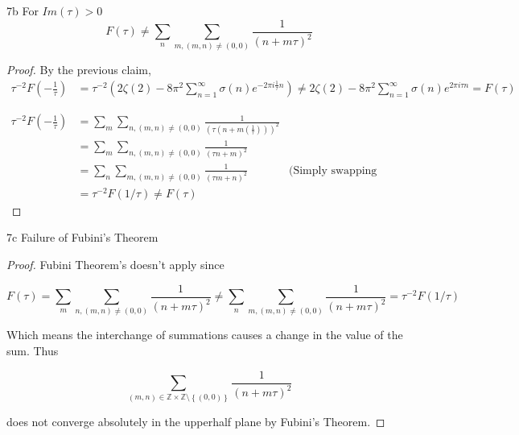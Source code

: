 \documentclass{article}
\newcommand{\Z}{\mathbb{Z}}
\begin{document}
\begin{PROB}{7b}\label{Problem 7b.}
    For $Im(\tau) > 0$ 
    \begin{equation*}
        F(\tau) \neq \sum_{n} \sum_{m, (m, n) \neq (0, 0)} \frac{1}{(n + m \tau)^2}
    \end{equation*}
\end{PROB}
\begin{proof}
    By the previous claim, 
    \begin{align*}
        \tau^{-2} F\left(-\frac{1}{\tau}\right) &= \tau^{-2}\left(2\zeta(2) - 8 \pi^2\sum_{n = 1}^{\infty} \sigma(n) e^{-2 \pi i \frac{1}{\tau} n}\right) \neq 2\zeta(2) - 8 \pi^2\sum_{n = 1}^{\infty} \sigma(n) e^{2 \pi i \tau n} = F(\tau)
    \end{align*}

    \begin{align*}
        \tau^{-2} F\left(-\frac{1}{\tau}\right) &= \sum_{m} \sum_{n, (m, n) \neq (0, 0)} \frac{1}{(\tau(n + m (\frac{1}{\tau})))^2} \\
        &=\sum_{m} \sum_{n, (m, n) \neq (0, 0)} \frac{1}{(\tau n + m)^2} \\
        &=\sum_{n} \sum_{m, (m, n) \neq (0, 0)} \frac{1}{(\tau m + n)^2} & \text{(Simply swapping symbol names)} \\
        &= \tau^{-2} F(1 / \tau) \neq F(\tau)
    \end{align*}
\end{proof}

\begin{claim}{7c}\label{Claim 7c.}
    Failure of Fubini's Theorem
\end{claim}
\begin{proof}
    Fubini Theorem's doesn't apply since 
    
    \begin{equation*}
        F(\tau) = \sum_{m} \sum_{n, (m, n) \neq (0, 0)} \frac{1}{(n + m \tau)^2} \neq \sum_{n} \sum_{m, (m, n) \neq (0, 0)} \frac{1}{(n + m \tau)^2} = \tau^{-2} F(1 / \tau)
    \end{equation*}

    Which means the interchange of summations causes a change in the value of the sum. Thus 
    
    \begin{equation*}
        \sum_{(m, n) \in \Z \times \Z \setminus \left\{ (0, 0) \right\}} \frac{1}{(n + m \tau)^2}
    \end{equation*}

    does not converge absolutely in the upperhalf plane by Fubini's Theorem.   
\end{proof}
\end{document}
